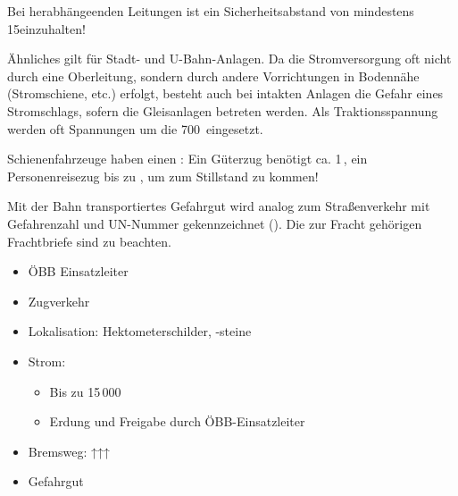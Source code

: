 {\begin{description}
  Bei herabhängeenden Leitungen ist ein Sicherheitsabstand
  von mindestens 15\Meter* einzuhalten!
  
  Ähnliches gilt für Stadt- und U-Bahn-Anlagen. Da die
  Stromversorgung oft nicht durch eine Oberleitung, sondern
  durch andere Vorrichtungen in Bodennähe (Stromschiene,
  etc.) erfolgt, besteht auch bei intakten Anlagen die
  Gefahr eines Stromschlags, sofern die Gleisanlagen
  betreten werden. Als Traktionsspannung werden oft
  Spannungen um die 700\, eingesetzt.
  \cite{U61989}
  \item[Problem Bremsweg]
  Schienenfahrzeuge haben einen : Ein Güterzug benötigt ca. 1\,,
  ein Personenreisezug bis zu , um
  zum Stillstand zu kommen!
  
  \item[Problem Gefahrgut]
  Mit der Bahn transportiertes Gefahrgut wird analog zum
  Straßenverkehr mit Gefahrenzahl und UN-Nummer
  gekennzeichnet (). Die
  zur Fracht gehörigen Frachtbriefe sind zu beachten.
\end{description}
}{%
\begin{itemize}
  \item ÖBB Einsatzleiter
  \item Zugverkehr
  \item Lokalisation: Hektometerschilder, -steine
  \item Strom:
  \begin{itemize}
    \item Bis zu 15\,000\,
    \item Erdung und Freigabe durch ÖBB-Einsatzleiter
  \end{itemize}
  \item Bremsweg: ↑↑↑
  \item Gefahrgut
\end{itemize}


}{}{}{}



















